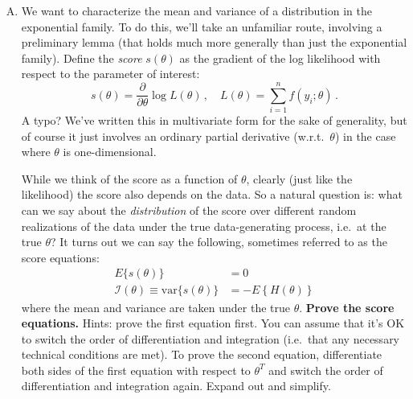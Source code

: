 \documentclass[11pt]{article}
\newcommand{\ynote}[1]{\color{red} #1 \color{black}}
\begin{document}
\begin{enumerate}[(A)]
\begin{enumerate}
\end{enumerate}
\bigskip

\item We want to characterize the mean and variance of a distribution in the exponential family.  To do this, we'll take an unfamiliar route, involving a preliminary lemma (that holds much more generally than just the exponential family).  Define the \emph{score} $s(\theta)$ as the gradient of the log likelihood with respect to the parameter of interest:  
$$
s(\theta) = \frac{\partial}{\partial \theta} \log L(\theta) \, , \quad L(\theta) = \sum_{i=1}^n f(y_i; \theta) \, .
$$
\ynote{A typo? }
We've written this in multivariate form for the sake of generality, but of course it just involves an ordinary partial derivative (w.r.t.~$\theta$) in the case where $\theta$ is one-dimensional.

While we think of the score as a function of $\theta$, clearly (just like the likelihood) the score also depends on the data.  So a natural question is: what can we say about the \emph{distribution} of the score over different random realizations of the data under the true data-generating process, i.e.~at the true $\theta$?  It turns out we can say the following, sometimes referred to as the score equations:  
$$
\begin{aligned}
E\{ s(\theta) \} &= 0 \\
\mathcal{I}(\theta) \equiv \mbox{var} \{ s(\theta) \}  &= - E \left\{ H(\theta) \right\}
\end{aligned}
$$
where the mean and variance are taken under the true $\theta$.  \textbf{Prove the score equations.}  Hints: prove the first equation first.  You can assume that it's OK to switch the order of differentiation and integration (i.e.~that any necessary technical conditions are met).  To prove the second equation, differentiate both sides of the first equation with respect to $\theta^T$ and switch the order of differentiation and integration again.  Expand out and simplify.  


\end{enumerate}
\end{document}
